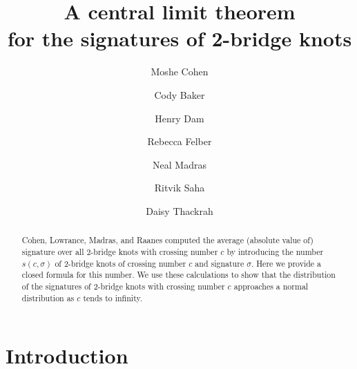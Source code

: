 \documentclass[11pt]{amsart}
\theoremstyle{definition}
\theoremstyle{remark}
\numberwithin{equation}{section}
\begin{document}
\title{A central limit theorem\\ for the signatures of 2-bridge knots}

\author{Moshe Cohen}
\address{Mathematics Department, State University of New York at New Paltz, New Paltz, NY 12561}

\author{Cody Baker}
\address{Mathematics Department, State University of New York at New Paltz, New Paltz, NY 12561}

\author{Henry Dam}
\address{Mathematics Department, State University of New York at New Paltz, New Paltz, NY 12561}

\author{Rebecca Felber}
\address{Mathematics Department, State University of New York at New Paltz, New Paltz, NY 12561}

\author{Neal Madras}
\address{Department of Mathematics and Statistics, York University, Toronto, ON M3J 1P3}

\author{Ritvik Saha}
\address{15 Alan Crest Dr, Hicksville, NY 11801}

\author{Daisy Thackrah}
\address{Mathematics Department, State University of New York at New Paltz, New Paltz, NY 12561}



\begin{abstract}
Cohen, Lowrance, Madras, and Raanes \cite{CLMR} computed the average (absolute value of) signature over all 2-bridge knots with crossing number $c$ by introducing the number $s(c,\sigma)$ of 2-bridge knots of crossing number $c$ and signature $\sigma$.  Here we provide a closed formula for this number.  We use these calculations to show that the distribution of the signatures of 2-bridge knots with crossing number $c$ approaches a normal distribution as $c$ tends to infinity. 
\end{abstract}



\maketitle



\section{Introduction}
\end{document}
